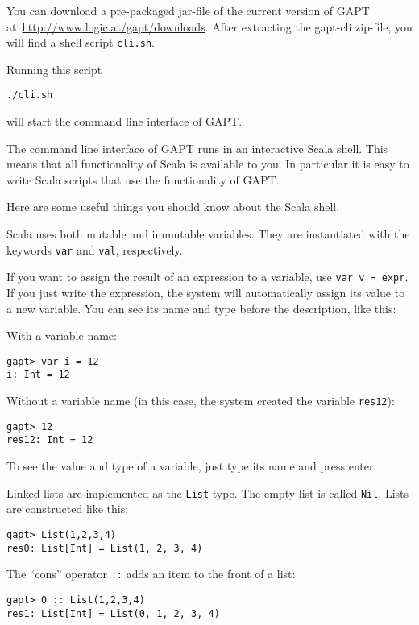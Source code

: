 \documentclass[a4paper,11pt]{article}
\begin{document}
You can download a pre-packaged jar-file of the current version of GAPT
at~\url{http://www.logic.at/gapt/downloads}. After extracting 
the gapt-cli zip-file, you will find a shell script \texttt{cli.sh}.

Running this script
\begin{lstlisting}[mathescape=false]
 ./cli.sh
\end{lstlisting}
will start the command line interface of GAPT.

The command line interface of GAPT runs in an interactive Scala shell. This
means that all functionality of Scala is available to you. In
particular it is easy to write Scala scripts that use the functionality of GAPT.

Here are some useful things you should know about the Scala shell.

Scala uses both mutable and immutable variables. They are instantiated
with the keywords \texttt{var} and \texttt{val}, respectively.

If you want to assign the result of an expression to a variable, use
\texttt{var v = expr}. If you just write the expression, the system will 
automatically assign its value to a new variable.
You can see its name and type before the description, like this:

With a variable name:

\begin{lstlisting}
gapt> var i = 12
i: Int = 12
\end{lstlisting}

Without a variable name (in this case, the system created the variable \texttt{res12}):

\begin{lstlisting}
gapt> 12
res12: Int = 12
\end{lstlisting}

To see the value and type of a variable, just type its name and press enter.

Linked lists are implemented as the \texttt{List} type. The empty list is called \texttt{Nil}.
Lists are constructed like this:
\begin{lstlisting}
gapt> List(1,2,3,4)
res0: List[Int] = List(1, 2, 3, 4)
\end{lstlisting}

The ``cons'' operator \texttt{::} adds an item to the front of a list:
\begin{lstlisting}
gapt> 0 :: List(1,2,3,4)
res1: List[Int] = List(0, 1, 2, 3, 4)
\end{lstlisting}
\end{document}
